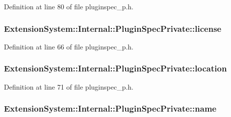 \-Definition at line 80 of file pluginspec\-\_\-p.\-h.

\hypertarget{class_extension_system_1_1_internal_1_1_plugin_spec_private_a8060ccf842513091c9821ad6118a22c0}{
\subsubsection[{license}]{ {\bf \-Extension\-System\-::\-Internal\-::\-Plugin\-Spec\-Private\-::license}}}\label{class_extension_system_1_1_internal_1_1_plugin_spec_private_a8060ccf842513091c9821ad6118a22c0}


\-Definition at line 66 of file pluginspec\-\_\-p.\-h.

\hypertarget{class_extension_system_1_1_internal_1_1_plugin_spec_private_a69f6532837e17c9858580b506b5c3448}{
\subsubsection[{location}]{ {\bf \-Extension\-System\-::\-Internal\-::\-Plugin\-Spec\-Private\-::location}}}\label{class_extension_system_1_1_internal_1_1_plugin_spec_private_a69f6532837e17c9858580b506b5c3448}


\-Definition at line 71 of file pluginspec\-\_\-p.\-h.

\hypertarget{class_extension_system_1_1_internal_1_1_plugin_spec_private_ab3a82ed362b9755352316778bda2c635}{
\subsubsection[{name}]{ {\bf \-Extension\-System\-::\-Internal\-::\-Plugin\-Spec\-Private\-::name}}}\label{class_extension_system_1_1_internal_1_1_plugin_spec_private_ab3a82ed362b9755352316778bda2c635}


